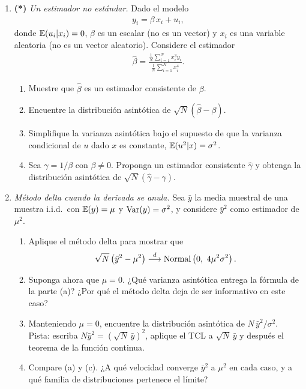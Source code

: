 \documentclass[letterpaper,11pt]{article}
\begin{document}
\begin{enumerate}[itemsep=1.2em]
\item \textbf{(*)} \emph{Un estimador no estándar.} Dado el modelo
    \begin{align*}
    y_i = \beta\,x_i + u_i,
    \end{align*}
    donde $\operatorname{\mathbb{E}}(u_i|x_i)=0$, $\beta$ es un escalar (no es un vector) y $x_i$ es una variable
    aleatoria (no es un vector aleatorio). Considere el estimador
    \begin{align*}
    \hat\beta = \frac{\frac{1}{N}\sum_{i=1}^N x_i^3 y_i}{\frac{1}{N}\sum_{i=1}^N x_i^4}.
    \end{align*}
    \begin{enumerate}
        \item Muestre que $\hat\beta$ es un estimador consistente de $\beta$.
        \item Encuentre la distribución asintótica de $\sqrt{N}(\hat\beta-\beta)$.
        \item Simplifique la varianza asintótica bajo el supuesto de que la varianza
              condicional de $u$ dado $x$ es constante, $\operatorname{\mathbb{E}}(u^2|x)=\sigma^2$.
        \item Sea $\gamma=1/\beta$ con $\beta\neq 0$. Proponga un estimador consistente
              $\hat\gamma$ y obtenga la distribución asintótica de $\sqrt{N}(\hat\gamma-\gamma)$.
    \end{enumerate}

\item \emph{Método delta cuando la derivada se anula.} Sea $\bar y$ la media muestral de una
    muestra i.i.d.\ con $\operatorname{\mathbb{E}}(y)=\mu$ y $\operatorname{Var}(y)=\sigma^2$, y considere $\bar y^2$ como estimador
    de $\mu^2$.
    \begin{enumerate}
        \item Aplique el método delta para mostrar que
              \begin{align*}
              \sqrt{N}\left(\bar y^2-\mu^2\right)\dto \N\left(0,\ 4\mu^2\sigma^2\right).
              \end{align*}
        \item Suponga ahora que $\mu=0$. ¿Qué varianza asintótica entrega la fórmula de la parte
              (a)? ¿Por qué el método delta deja de ser informativo en este caso?
        \item Manteniendo $\mu=0$, encuentre la distribución asintótica de
              $N\,\bar y^2/\sigma^2$. \\
              Pista: escriba $N\bar y^2=\left(\sqrt{N}\,\bar y\right)^2$, aplique el TCL a
              $\sqrt{N}\,\bar y$ y después el teorema de la función continua.
        \item Compare (a) y (c). ¿A qué velocidad converge $\bar y^2$ a $\mu^2$ en cada caso, y
              a qué familia de distribuciones pertenece el límite?
    \end{enumerate}


\end{enumerate}
\end{document}
